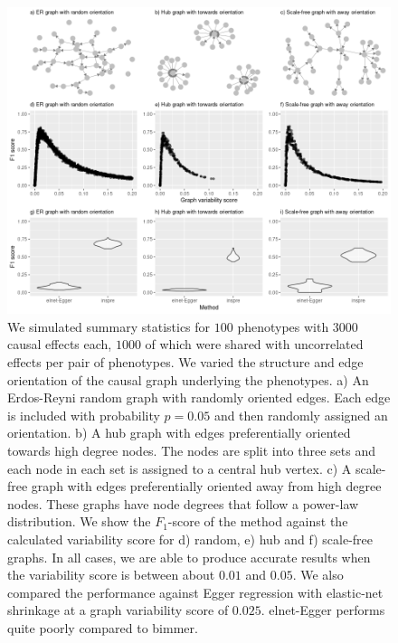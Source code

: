 \documentclass{article}
\begin{document}
\begin{figure}\label{figure4}
\includegraphics[width=\textwidth]{figures/figure4.png}
\caption{We simulated summary statistics for $100$ phenotypes with $3000$ causal
effects each, $1000$ of which were shared with uncorrelated effects per pair of phenotypes.
We varied the structure and edge orientation of the causal graph underlying the phenotypes.
a) An Erdos-Reyni random graph with randomly oriented edges. Each edge is
included with probability $p=0.05$ and then randomly assigned an orientation. b) A hub
graph with edges preferentially oriented towards high degree nodes. The nodes are split into
three sets and each node in each set is assigned to a central hub vertex. c) A scale-free
graph with edges preferentially oriented away from high degree nodes. These graphs have
node degrees that follow a power-law distribution. We show the $F_1$-score of the method
against the calculated variability score for d) random, e) hub and f) scale-free graphs.
In all cases, we are able to produce accurate results when the variability score is between
about $0.01$ and $0.05$. We also compared the performance against Egger regression
with elastic-net shrinkage at a graph variability score of $0.025$. elnet-Egger
performs quite poorly compared to bimmer.
}
\end{figure}
\end{document}
